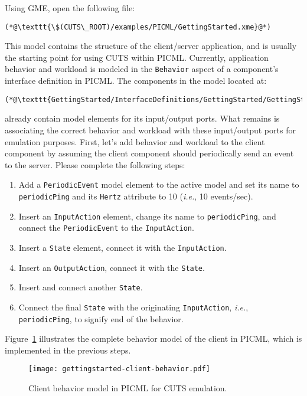 Using GME, open the following file: 
\begin{lstlisting}
(*@\texttt{\$(CUTS\_ROOT)/examples/PICML/GettingStarted.xme}@*)
\end{lstlisting}
This model contains the structure of the client/\-server application, and 
is usually the starting point for using CUTS within PICML. 
Currently, application behavior and workload is modeled in the \texttt{Behavior}
aspect of a component's interface definition in PICML. The components in the model
located at:
\begin{lstlisting}
(*@\texttt{GettingStarted/InterfaceDefinitions/GettingStarted/GettingStarted}@*)
\end{lstlisting}
already contain model elements for its input/\-output ports. What remains is associating
the correct behavior and workload with these input/\-output ports for emulation
purposes. First, let's add behavior and workload to the client component by 
assuming the client component should periodically send an event to the server.
Please complete the following steps:
\begin{enumerate}
  \item Add a \texttt{PeriodicEvent} model element to the active model and 
  set its name to \texttt{periodicPing} and its \texttt{Hertz} attribute to 
  10 (\textit{i.e.}, 10 events/sec). 
  
  \item Insert an \texttt{InputAction} element, change its name to 
  \texttt{periodicPing}, and connect the \texttt{PeriodicEvent} to 
  the \texttt{InputAction}.

  \item Insert a \texttt{State} element, connect it with the \texttt{InputAction}.

  \item Insert an \texttt{OutputAction}, connect it with the \texttt{State}.

  \item Insert and connect another \texttt{State}. 

  \item Connect the final \texttt{State} with the originating \texttt{InputAction},
  \textit{i.e.}, \texttt{periodicPing}, to signify end of the behavior.
\end{enumerate}
Figure~\ref{fig:gettingstarted-client-behavior} illustrates the complete behavior 
model of the client in PICML, which is implemented in the previous steps.
\begin{figure}
  \centering
  \texttt{[image: gettingstarted-client-behavior.pdf]}
  \caption{Client behavior model in PICML for CUTS emulation.}
  \label{fig:gettingstarted-client-behavior}
\end{figure}

